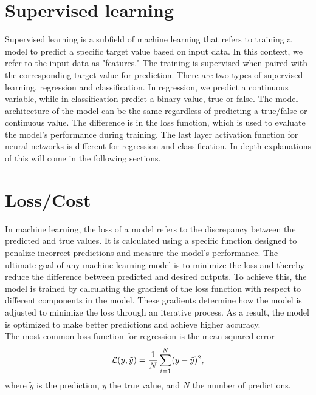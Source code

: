 \section{Supervised learning} \label{sec:supervised_learning}
Supervised learning is a subfield of machine learning that refers to training a model to predict a specific target value based on input data.
In this context, we refer to the input data as "features." The training is supervised when paired with the corresponding target value for prediction.
There are two types of supervised learning, regression and classification. 
In regression, we predict a continuous variable, while in classification predict a binary value, true or false.
The model architecture of the model can be the same regardless of predicting a true/false or continuous value. 
The difference is in the loss function, which is used to evaluate the model's performance during training. The last layer activation function for neural networks is different for regression and classification. 
In-depth explanations of this will come in the following sections.

\section{Loss/Cost} \label{sec:loss_cost}
In machine learning, the loss of a model refers to the discrepancy between the predicted and true values.
It is calculated using a specific function designed to penalize incorrect predictions and measure the model's performance.
The ultimate goal of any machine learning model is to minimize the loss and thereby reduce the difference between predicted and desired outputs.
To achieve this, the model is trained by calculating the gradient of the loss function with respect to different components in the model.
These gradients determine how the model is adjusted to minimize the loss through an iterative process.
As a result, the model is optimized to make better predictions and achieve higher accuracy.\\

The most common loss function for regression is the mean squared error
\begin{equation} \label{eq:mse}
    \mathcal{L}(y, \Tilde{y}) = \frac{1}{N}\sum_{i=1}^N(y-\Tilde{y})^2,
\end{equation}
where $\tilde{y}$ is the prediction, $y$ the true value, and $N$ the number of predictions.

